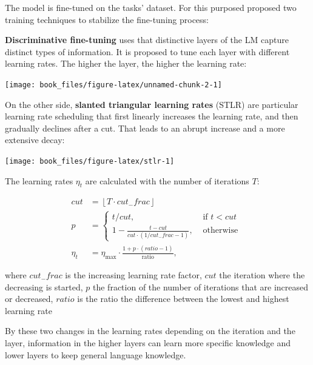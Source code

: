 \documentclass[]{krantz}
\begin{document}
The model is fine-tuned on the tasks' dataset. For this purposed \citet{howardruder2018} proposed two training techniques to stabilize the fine-tuning process:

\textbf{Discriminative fine-tuning} uses that distinctive layers of the LM capture distinct types of information. It is proposed to tune each layer with different learning rates. The higher the layer, the higher the learning rate:

\begin{center}\texttt{[image: book\_files/figure-latex/unnamed-chunk-2-1]} \end{center}

On the other side, \textbf{slanted triangular learning rates} (STLR) are particular learning rate scheduling that first linearly increases the learning rate, and then gradually declines after a cut. That leads to an abrupt increase and a more extensive decay:

\begin{center}\texttt{[image: book\_files/figure-latex/stlr-1]} \end{center}

The learning rates \(\eta_{t}\) are calculated with the number of iterations \(T\): \newline 

\[\begin{aligned}
c u t &=\left\lfloor T \cdot c u t_{-} f r a c\right\rfloor \\
p &=\left\{\begin{array}{ll}
t / c u t, & \text { if } t<c u t \\
1-\frac{t-c u t}{c u t \cdot\left(1 / c u t_{-} f r a c-1\right)}, & \text { otherwise }
\end{array}\right.\\
\eta_{t} &=\eta_{\max } \cdot \frac{1+p \cdot(r a t i o-1)}{\text {ratio}}, 
\end{aligned}\]

where \(c u t_{-} f r a c\) is the increasing learning rate factor, \(c u t\) the iteration where the decreasing is started, \(p\) the fraction of the number of iterations that are increased or decreased, \(ratio\) is the ratio the difference between the lowest and highest learning rate

By these two changes in the learning rates depending on the iteration and the layer, information in the higher layers can learn more specific knowledge and lower layers to keep general language knowledge.
\end{document}

